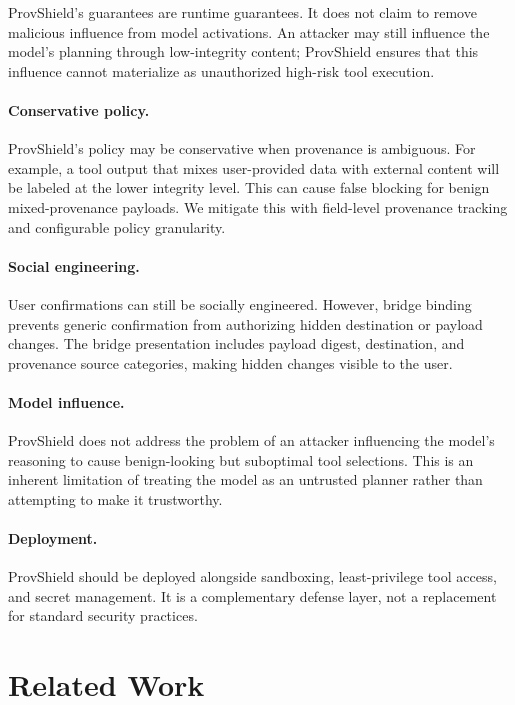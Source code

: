 \documentclass[sigconf,anonymous,review]{acmart}
\begin{document}
ProvShield's guarantees are runtime guarantees. It does not claim to remove malicious influence from model activations. An attacker may still influence the model's planning through low-integrity content; ProvShield ensures that this influence cannot materialize as unauthorized high-risk tool execution.

\paragraph{Conservative policy.} ProvShield's policy may be conservative when provenance is ambiguous. For example, a tool output that mixes user-provided data with external content will be labeled at the lower integrity level. This can cause false blocking for benign mixed-provenance payloads. We mitigate this with field-level provenance tracking and configurable policy granularity.

\paragraph{Social engineering.} User confirmations can still be socially engineered. However, bridge binding prevents generic confirmation from authorizing hidden destination or payload changes. The bridge presentation includes payload digest, destination, and provenance source categories, making hidden changes visible to the user.

\paragraph{Model influence.} ProvShield does not address the problem of an attacker influencing the model's reasoning to cause benign-looking but suboptimal tool selections. This is an inherent limitation of treating the model as an untrusted planner rather than attempting to make it trustworthy.

\paragraph{Deployment.} ProvShield should be deployed alongside sandboxing, least-privilege tool access, and secret management. It is a complementary defense layer, not a replacement for standard security practices.

\section{Related Work}
\label{sec:related}
\end{document}
